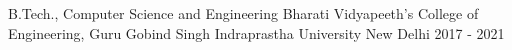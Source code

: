 \smallskip


\begin{cventries}

  \cventry
    {B.Tech., Computer Science and Engineering} %
    {Bharati Vidyapeeth’s College of Engineering, Guru Gobind Singh Indraprastha University} %
    {New Delhi} %
    {2017 - 2021} %
    {}
    
\vspace{-0.5cm}    
\end{cventries}
